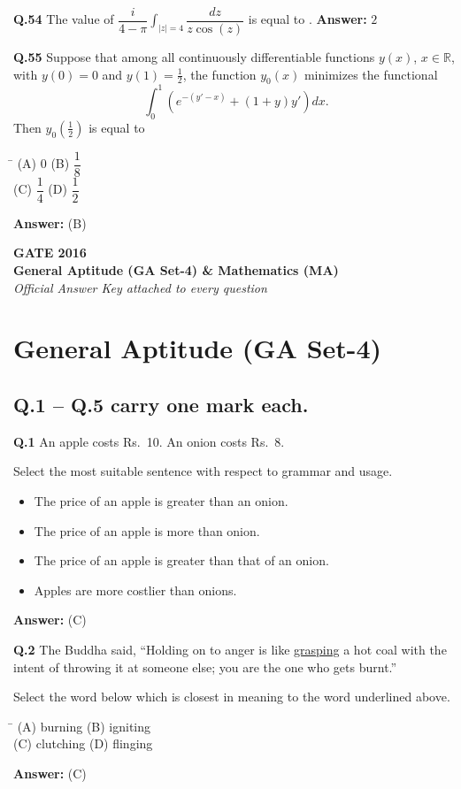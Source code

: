\documentclass[11pt,a4paper]{article}
\newcommand{\optsfourA}[4]{%
  \begin{tabbing}
    \hspace{0.48\linewidth}\=\kill
    (A) #1 \> (B) #2 \\[2pt]
    (C) #3 \> (D) #4
  \end{tabbing}%
}
\newcommand{\optslistA}[4]{%
  \begin{itemize}
    \setlength{\itemsep}{2pt}\setlength{\parskip}{0pt}
    \item[(A)] #1
    \item[(B)] #2
    \item[(C)] #3
    \item[(D)] #4
  \end{itemize}%
}
\newcommand{\ans}[1]{\textbf{Answer:} #1\par\medskip}
\begin{document}
\textbf{Q.54} The value of $\dfrac{i}{4 - \pi} \displaystyle\int_{|z|=4} \dfrac{dz}{z\cos(z)}$ is equal to \underline{\hspace{2cm}}.
\ans{$2$}

\textbf{Q.55} Suppose that among all continuously differentiable functions $y(x)$, $x \in \mathbb{R}$, with $y(0) = 0$ and $y(1) = \frac{1}{2}$, the function $y_0(x)$ minimizes the functional
\[
  \int_0^1 \left(e^{-(y' - x)} + (1 + y)y'\right) dx.
\]
Then $y_0\!\left(\frac{1}{2}\right)$ is equal to
\optsfourA{$0$}{$\dfrac{1}{8}$}{$\dfrac{1}{4}$}{$\dfrac{1}{2}$}
\ans{(B)}

\newpage


\begin{center}
  {\LARGE\bfseries GATE 2016}\\[4pt]
  {\large\bfseries General Aptitude (GA Set-4) \& Mathematics (MA)}\\[2pt]
  {\small\itshape Official Answer Key attached to every question}
\end{center}
\medskip

\section*{General Aptitude (GA Set-4)}

\subsection*{Q.1 -- Q.5 carry one mark each.}

\textbf{Q.1} An apple costs Rs.~10. An onion costs Rs.~8.

Select the most suitable sentence with respect to grammar and usage.
\optslistA{The price of an apple is greater than an onion.}{The price of an apple is more than onion.}{The price of an apple is greater than that of an onion.}{Apples are more costlier than onions.}
\ans{(C)}

\textbf{Q.2} The Buddha said, ``Holding on to anger is like \underline{grasping} a hot coal with the intent of throwing it at someone else; you are the one who gets burnt.''

Select the word below which is closest in meaning to the word underlined above.
\optsfourA{burning}{igniting}{clutching}{flinging}
\ans{(C)}
\end{document}
